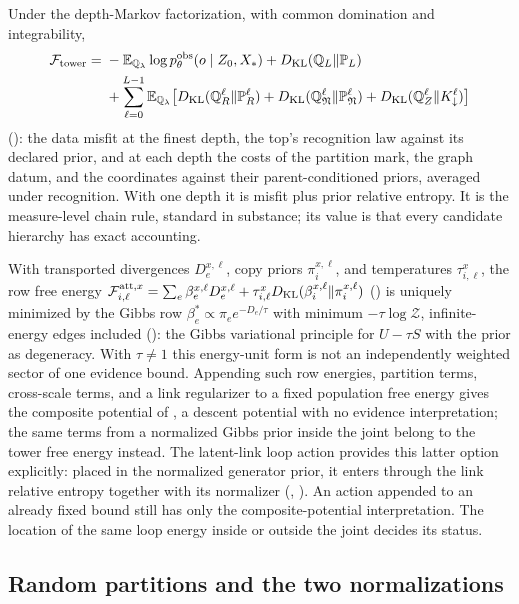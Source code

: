 Under the depth-Markov factorization, with common domination and integrability,
\[
\begin{aligned}
\mathcal F_{\mathrm{tower}}
={}&-\mathbb E_{\mathbb Q_\lambda}\log p^{\mathrm{obs}}_\theta(o\mid Z_0,X_*)
+D_{\mathrm{KL}}(\mathbb Q_L\Vert\mathbb P_L)\\
&+\sum_{\ell=0}^{L-1}\mathbb E_{\mathbb Q_\lambda}\bigl[
D_{\mathrm{KL}}(\mathbb Q^\ell_R\Vert\mathbb P^\ell_R)
+D_{\mathrm{KL}}(\mathbb Q^\ell_{\mathfrak N}\Vert\mathbb P^\ell_{\mathfrak N})
+D_{\mathrm{KL}}(\mathbb Q^\ell_Z\Vert K^\ell_\downarrow)\bigr]
\end{aligned}
\]
(): the data misfit at the finest depth, the top's recognition law
against its declared prior, and at each depth the costs of the partition mark, the graph datum, and the
coordinates against their parent-conditioned priors, averaged under recognition. With one depth it is
misfit plus prior relative entropy. It is the measure-level chain rule, standard in substance; its value
is that every candidate hierarchy has exact accounting.

With transported divergences $D^{x,\ell}_e$, copy priors $\pi^{x,\ell}_i$, and temperatures
$\tau^x_{i,\ell}$, the row free energy
$\mathcal F^{\mathrm{att},x}_{i,\ell}=\sum_e\beta^{x,\ell}_eD^{x,\ell}_e+\tau^x_{i,\ell}D_{\mathrm{KL}}(\beta^{x,\ell}_i\Vert\pi^{x,\ell}_i)$
() is uniquely minimized by the Gibbs row
$\beta^*_e\propto\pi_ee^{-D_e/\tau}$ with minimum $-\tau\log\mathcal Z$, infinite-energy edges included
(): the Gibbs variational principle for $U-\tau S$ with the prior as
degeneracy. With $\tau\ne1$ this energy-unit form is not an independently weighted sector of one
evidence bound. Appending such row energies, partition terms, cross-scale terms, and a link regularizer
to a fixed population free energy gives the composite potential of
, a descent potential with no evidence interpretation; the same
terms from a normalized Gibbs prior inside the joint belong to the tower free energy instead.
The latent-link loop action provides this latter option explicitly: placed in the normalized
generator prior, it enters through the link relative entropy together with its normalizer
(, ). An action appended to an already
fixed bound still has only the composite-potential interpretation. The location of the same loop
energy inside or outside the joint decides its status.

\subsection{Random partitions and the two normalizations}


